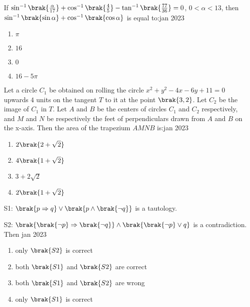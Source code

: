 \iffalse
   \title{Assignment}
   \author{EE24BTECH11034}
   \section{mcq-single}
\fi 
    \item If $\sin^{-1}\brak{\frac{\alpha}{17}} + \cos^{-1}\brak{\frac{4}{5}} - \tan^{-1}\brak{\frac{77}{36}} = 0$, $0 < \alpha <13$, then $\sin^{-1}\brak{\sin \alpha} + \cos^{-1}\brak{\cos \alpha}$ is equal to:\hfill{jan 2023}
        
        \begin{multicols}{4}
        \begin{enumerate}
        \item $\pi$
        \item $16$
        \item $0$
        \item $16 - 5\pi$
        \end{enumerate}
        \end{multicols}

    \item Let a circle $C_{1}$ be obtained on rolling the circle $x^{2}+y^{2}-4x-6y+11=0$ upwards $4$ units on the tangent $T$ to it at the point $\brak{3, 2}$. Let $C_{2}$ be the image of $C_{1}$ in $T$. Let $A$ and $B$ be the centers of circles $C_{1}$ and $C_{2}$ respectively, and $M$ and $N$ be respectively the feet of perpendiculars drawn from $A$ and $B$ on the x-axis. Then the area of the trapezium $AMNB$ is:\hfill{jan 2023}
    
        \begin{multicols}{4}
        \begin{enumerate}
        \item $2\brak{2+\sqrt{2}}$
        \item $4\brak{1+\sqrt{2}}$
        \item $3+2\sqrt{2}$
        \item $2\brak{1+\sqrt{2}}$
        \end{enumerate}
        \end{multicols}
        
    \item S1: $\brak{p\Rightarrow q}\lor\brak{p\land\brak{\neg q}}$ is a tautology.

      S2: $\brak{\brak{\neg p}\Rightarrow\brak{\neg q}}\land\brak{\brak{\neg p}\lor q}$ is a contradiction. Then \hfill{jan 2023}
    
        \begin{enumerate}
        \item only $\brak{S2}$ is correct
        \item both $\brak{S1}$ and $\brak{S2}$ are correct
        \item both $\brak{S1}$ and $\brak{S2}$ are wrong
        \item only $\brak{S1}$ is correct
        \end{enumerate}
    
